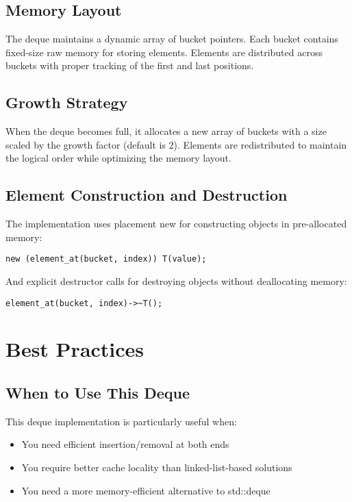 \documentclass[a4paper,12pt]{article}
\begin{document}
\subsection{Memory Layout}
The deque maintains a dynamic array of bucket pointers. Each bucket contains fixed-size raw memory for storing elements. Elements are distributed across buckets with proper tracking of the first and last positions.

\subsection{Growth Strategy}
When the deque becomes full, it allocates a new array of buckets with a size scaled by the growth factor (default is 2). Elements are redistributed to maintain the logical order while optimizing the memory layout.

\subsection{Element Construction and Destruction}
The implementation uses placement new for constructing objects in pre-allocated memory:

\begin{lstlisting}
new (element_at(bucket, index)) T(value);
\end{lstlisting}

And explicit destructor calls for destroying objects without deallocating memory:

\begin{lstlisting}
element_at(bucket, index)->~T();
\end{lstlisting}

\section{Best Practices}

\subsection{When to Use This Deque}
This deque implementation is particularly useful when:
\begin{itemize}
    \item You need efficient insertion/removal at both ends
    \item You require better cache locality than linked-list-based solutions
    \item You need a more memory-efficient alternative to std::deque
\end{itemize}
\end{document}
